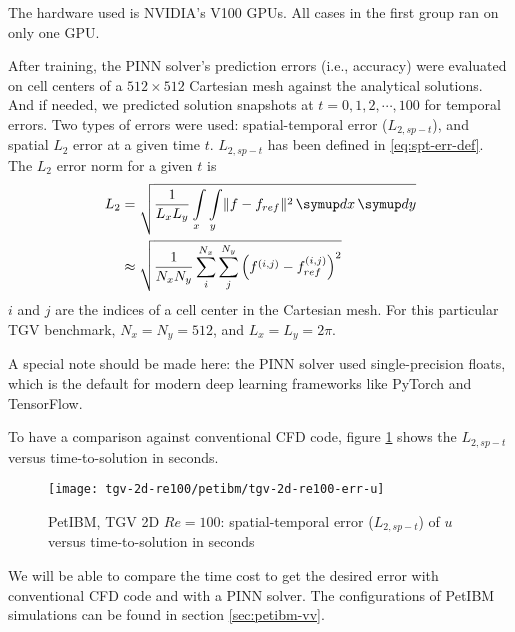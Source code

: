 The hardware used is NVIDIA's V100 GPUs.
All cases in the first group ran on only one GPU.

After training, the PINN solver's prediction errors (i.e., accuracy) were evaluated on cell centers of a $512 \times 512$ Cartesian mesh against the analytical solutions.
And if needed, we predicted solution snapshots at $t=0, 1, 2, \cdots, 100$ for temporal errors.
Two types of errors were used: spatial-temporal error ($L_{2,sp-t}$), and spatial $L_2$ error at a given time $t$.
$L_{2,sp-t}$ has been defined in \eqref{eq:spt-err-def}.
The $L_2$ error norm for a given $t$ is
\begin{equation}\label{eq:l2norm}
    \begin{aligned}
        L_2
        &=
        \sqrt{
            \frac{1}{L_x L_y}
            \int\limits_{x}\int\limits_{y} \lVert f - f_{ref}\rVert^2
            \diff x \diff y
        } \\
        &\approx
        \sqrt{
            \frac{1}{N_x N_y}
            \sum\limits_{i}^{N_x}\sum\limits_{j}^{N_y}
            \left(f^{\left(i, j\right)}-f_{ref}^{\left(i, j\right)}\right)^2
        }
    \end{aligned}
\end{equation}
$i$ and $j$ are the indices of a cell center in the Cartesian mesh.
For this particular TGV benchmark, $N_x=N_y=512$, and $L_x=L_y=2\pi$.

A special note should be made here: the PINN solver used single-precision floats, which is the default for modern deep learning frameworks like PyTorch and TensorFlow.

To have a comparison against conventional CFD code, figure \ref{fig:petibm-tgv-spatial-temporal-error} shows the $L_{2,sp-t}$ versus time-to-solution in seconds.
\begin{figure}[hbt!]
    \centering%
    \texttt{[image: tgv-2d-re100/petibm/tgv-2d-re100-err-u]}%
    \caption[%
        PetIBM, TGV 2D $Re=100$: spatial-temporal error ($L_{2,sp-t}$) of $u$%
    ]{%
        PetIBM, TGV 2D $Re=100$: spatial-temporal error ($L_{2,sp-t}$)  of $u$ versus time-to-solution in seconds%
    }\label{fig:petibm-tgv-spatial-temporal-error}%
\end{figure}
We will be able to compare the time cost to get the desired error with conventional CFD code and with a PINN solver.
The configurations of PetIBM simulations can be found in section \ref{sec:petibm-vv}.
